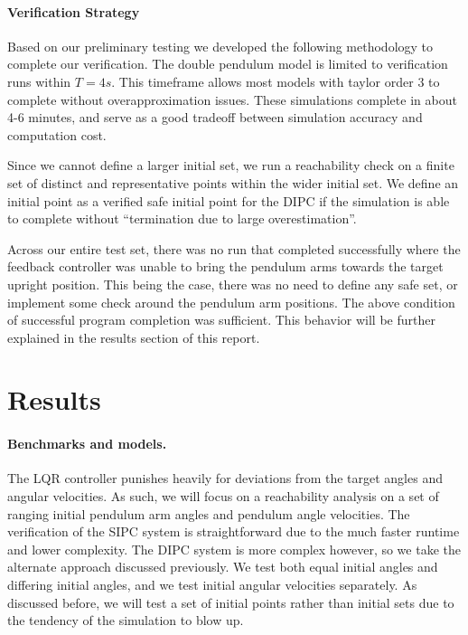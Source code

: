 \documentclass{article}
\theoremstyle{plain}
\theoremstyle{definition}
\theoremstyle{remark}
\begin{document}
\paragraph{Verification Strategy}Based on our preliminary testing we developed the following methodology to complete our verification. The double pendulum model is limited to verification runs within $T = 4s$. This timeframe allows most models with taylor order 3 to complete without overapproximation issues. These simulations complete in about 4-6 minutes, and serve as a good tradeoff between simulation accuracy and computation cost.

Since we cannot define a larger initial set, we run a reachability check on a finite set of distinct and representative points within the wider initial set. We define an initial point as a verified safe initial point for the DIPC if the simulation is able to complete without “termination due to large overestimation”. 

Across our entire test set, there was no run that completed successfully where the feedback controller was unable to bring the pendulum arms towards the target upright position. This being the case, there was no need to define any safe set, or implement some check around the pendulum arm positions. The above condition of successful program completion was sufficient. This behavior will be further explained in the results section of this report.

\section{Results}
\label{results}

\paragraph{Benchmarks and models.}
The LQR controller punishes heavily for deviations from the target angles and angular velocities. As such, we will focus on a reachability analysis on a set of ranging initial pendulum arm angles and pendulum angle velocities. The verification of the SIPC system is straightforward due to the much faster runtime and lower complexity. The DIPC system is more complex however, so we take the alternate approach discussed previously. We test both equal initial angles and differing initial angles, and we test initial angular velocities separately. As discussed before, we will test a set of initial points rather than initial sets due to the tendency of the simulation to blow up.
\end{document}
